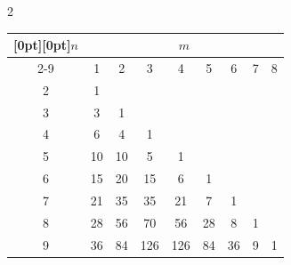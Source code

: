 \begin{multicols}{2}
\begin{center}
\vspace*{2ex}





{\small


\begin{tabular}{|c|c|c|c|c|c|c|c|c|}


\hline


\multicolumn{1}{|c|}{\raisebox{-4pt}[0pt][0pt]{$n$}}&\multicolumn{8}{c|}{$m$}\\


\cline{2-9}





&1&2&3&4&5&6&7&8\\


\hline


2&\hphantom{9}1&&&&&&&\\


3&\hphantom{9}3&\hphantom{9}1&&&&&&\\


4&\hphantom{9}6&\hphantom{9}4&\hphantom{99}1&&&&&\\


5&10&10&\hphantom{99}5&\hphantom{99}1&&&&\\


6&15&20&\hphantom{9}15&\hphantom{99}6&\hphantom{9}1&&&\\


7&21&35&\hphantom{9}35&\hphantom{9}21&\hphantom{9}7&\hphantom{9}1&&\\


8&28&56&\hphantom{9}70&\hphantom{9}56&28&\hphantom{9}8&1&\\


9&36&84&126&126&84&36&9&1\\


\hline


\end{tabular}


}


\end{center}


\columnbreak












\setcounter{table}{1}









\end{multicols}
